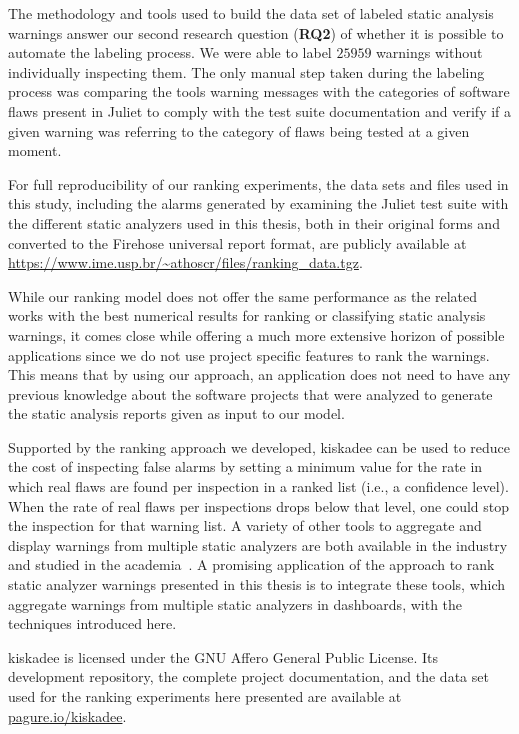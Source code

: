 The methodology and tools used to build the data set of labeled static analysis
warnings answer our second research question (\textbf{RQ2}) of whether it is
possible to automate the labeling process. We were able to 
label $25959$ warnings without individually inspecting them. The only manual step
taken during the labeling process was comparing the tools warning messages with
the categories of software flaws present in Juliet to comply with the test suite
documentation and verify if a given warning was referring to the category of flaws
being tested at a given moment.

For full reproducibility of our ranking experiments, the data sets and files
used in this study, including the alarms generated by examining the Juliet test
suite with the different static analyzers used in this thesis, both in their
original forms and converted to the Firehose universal report format, are
publicly available at
\url{https://www.ime.usp.br/~athoscr/files/ranking_data.tgz}.

While our ranking model does not offer the same performance as the related
works with the best numerical results for ranking or classifying static
analysis warnings, it comes close while offering a much more extensive horizon
of possible applications since we do not use project specific features to rank
the warnings. This means that by using our approach, an application does not
need to have any previous knowledge about the software projects that were
analyzed to generate the static analysis reports given as input to our model.

Supported by the ranking approach we developed, kiskadee can be used to reduce the
cost of inspecting false alarms by setting a minimum value for the rate in
which real flaws are found per inspection in a ranked list (i.e., a confidence
level). When the rate of real flaws per inspections drops below that level, one
could stop the inspection for that warning list. A variety of other tools to
aggregate and display warnings from multiple static analyzers are both
available in the industry and studied in the academia~\citep{buckers2017uav,
heinemann2014teamscale}. A promising application of the approach to rank static
analyzer warnings presented in this thesis is to integrate these tools, which
aggregate warnings from multiple static analyzers in dashboards, with the
techniques introduced here. 

kiskadee is licensed under the GNU Affero General Public License. Its
development repository, the complete project documentation, and the data set
used for the ranking experiments here presented are available at
\url{pagure.io/kiskadee}.

